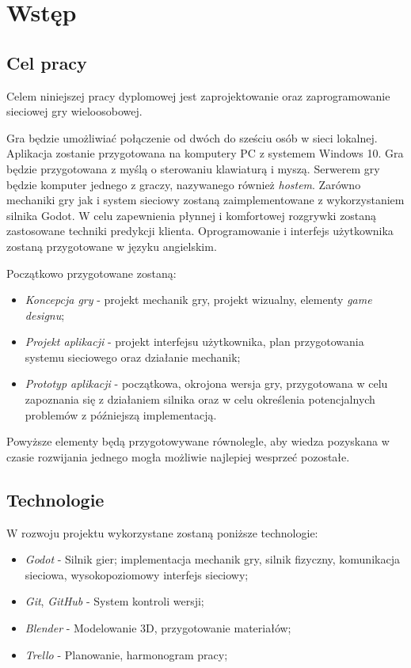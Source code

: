 \chapter*{Wstęp}
\section*{Cel pracy}

Celem niniejszej pracy dyplomowej jest zaprojektowanie oraz zaprogramowanie sieciowej gry wieloosobowej.

Gra będzie umożliwiać połączenie od dwóch do sześciu osób w sieci lokalnej. Aplikacja zostanie przygotowana na komputery PC z systemem Windows 10. Gra będzie przygotowana z myślą o sterowaniu klawiaturą i myszą.
Serwerem gry będzie komputer jednego z graczy, nazywanego również \emph{hostem}.
Zarówno mechaniki gry jak i system sieciowy zostaną zaimplementowane z wykorzystaniem silnika Godot. \cite{godot_main}
W celu zapewnienia płynnej i komfortowej rozgrywki zostaną zastosowane techniki predykcji klienta.
Oprogramowanie i interfejs użytkownika zostaną przygotowane w języku angielskim.

Początkowo przygotowane zostaną:
\begin{itemize}
    \item \emph{Koncepcja gry} - projekt mechanik gry, projekt wizualny, elementy \emph{game designu};
    \item \emph{Projekt aplikacji} - projekt interfejsu użytkownika, plan przygotowania systemu sieciowego oraz działanie mechanik;
    \item \emph{Prototyp aplikacji} - początkowa, okrojona wersja gry, przygotowana w celu zapoznania się z działaniem silnika oraz w celu określenia potencjalnych problemów z późniejszą implementacją. 
\end{itemize}

Powyższe elementy będą przygotowywane równolegle, aby wiedza pozyskana w czasie rozwijania jednego mogła możliwie najlepiej wesprzeć pozostałe.

\section*{Technologie}
W rozwoju projektu wykorzystane zostaną poniższe technologie:
\begin{itemize}
    \item \emph{Godot} - Silnik gier; implementacja mechanik gry, silnik fizyczny, komunikacja sieciowa, wysokopoziomowy interfejs sieciowy;
    \item \emph{Git}, \emph{GitHub} - System kontroli wersji;
    \item \emph{Blender} - Modelowanie 3D, przygotowanie materiałów;
    \item \emph{Trello} - Planowanie, harmonogram pracy;
\end{itemize}